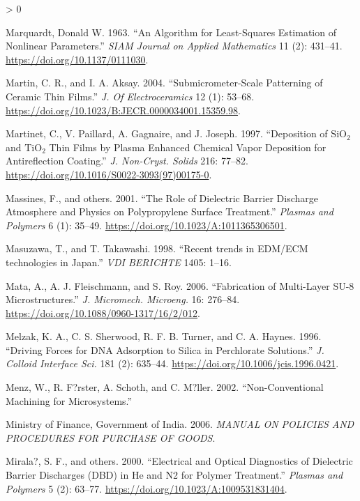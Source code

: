 \documentclass[
  10pt,
  twoside]{article}
\newlength{\cslhangindent}
\newenvironment{CSLReferences}[2] %
 {%
  \setlength{\parindent}{0pt}
  \ifodd #1 \everypar{\setlength{\hangindent}{\cslhangindent}}\ignorespaces\fi
  \ifnum #2 > 0
  \setlength{\parskip}{#2\baselineskip}
  \fi
 }%
 {}
\begin{document}
\begin{CSLReferences}{1}{0}
\leavevmode\hypertarget{ref-Marq1963}{}%
Marquardt, Donald W. 1963. {``An Algorithm for Least-Squares Estimation of Nonlinear Parameters.''} \emph{SIAM Journal on Applied Mathematics} 11 (2): 431--41. \url{https://doi.org/10.1137/0111030}.

\leavevmode\hypertarget{ref-Mart04}{}%
Martin, C. R., and I. A. Aksay. 2004. {``Submicrometer-Scale Patterning of Ceramic Thin Films.''} \emph{J. Of Electroceramics} 12 (1): 53--68. \url{https://doi.org/10.1023/B:JECR.0000034001.15359.98}.

\leavevmode\hypertarget{ref-Mart1997}{}%
Martinet, C., V. Paillard, A. Gagnaire, and J. Joseph. 1997. {``Deposition of \(\mathrm{SiO_2}\) and \(\mathrm{TiO_2}\) Thin Films by Plasma Enhanced Chemical Vapor Deposition for Antireflection Coating.''} \emph{J. Non-Cryst. Solids} 216: 77--82. \url{https://doi.org/10.1016/S0022-3093(97)00175-0}.

\leavevmode\hypertarget{ref-Mass01}{}%
Massines, F., and others. 2001. {``The Role of Dielectric Barrier Discharge Atmosphere and Physics on Polypropylene Surface Treatment.''} \emph{Plasmas and Polymers} 6 (1): 35--49. \url{https://doi.org/10.1023/A:1011365306501}.

\leavevmode\hypertarget{ref-Masu1998}{}%
Masuzawa, T., and T. Takawashi. 1998. {``{Recent trends in EDM/ECM technologies in Japan}.''} \emph{VDI BERICHTE} 1405: 1--16.

\leavevmode\hypertarget{ref-Mata06}{}%
Mata, A., A. J. Fleischmann, and S. Roy. 2006. {``Fabrication of Multi-Layer {SU-8} Microstructures.''} \emph{J. Micromech. Microeng.} 16: 276--84. \url{https://doi.org/10.1088/0960-1317/16/2/012}.

\leavevmode\hypertarget{ref-Melz1996}{}%
Melzak, K. A., C. S. Sherwood, R. F. B. Turner, and C. A. Haynes. 1996. {``Driving Forces for {DNA} Adsorption to Silica in Perchlorate Solutions.''} \emph{J. Colloid Interface Sci.} 181 (2): 635--44. \url{https://doi.org/10.1006/jcis.1996.0421}.

\leavevmode\hypertarget{ref-Menz02}{}%
Menz, W., R. F?rster, A. Schoth, and C. M?ller. 2002. {``Non-Conventional Machining for Microsystems.''}

\leavevmode\hypertarget{ref-PurchaseManualGOI2006}{}%
Ministry of Finance, Government of India. 2006. \emph{MANUAL ON POLICIES AND PROCEDURES FOR PURCHASE OF GOODS}.

\leavevmode\hypertarget{ref-Mira00}{}%
Mirala?, S. F., and others. 2000. {``Electrical and Optical Diagnostics of Dielectric Barrier Discharges {(DBD) in He and N2} for Polymer Treatment.''} \emph{Plasmas and Polymers} 5 (2): 63--77. \url{https://doi.org/10.1023/A:1009531831404}.


\end{CSLReferences}
\end{document}
